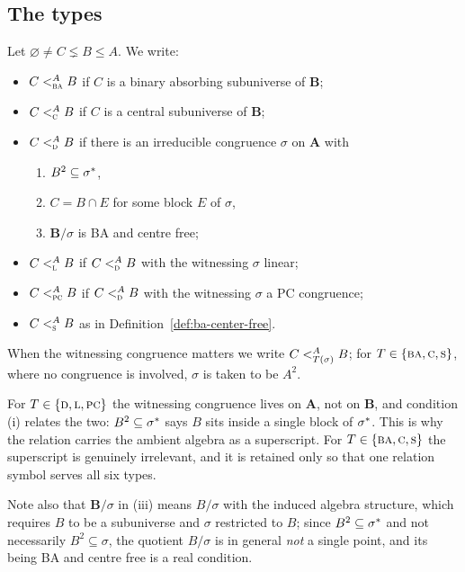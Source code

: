 \subsection{The types}

\begin{definition}\label{def:types}
Let $\varnothing\neq C\lneq B\le A$. We write:
\begin{itemize}\tightlist
\item $C\subt[A]{\TBA}B$ if $C$ is a binary absorbing subuniverse of
  $\mathbf B$;
\item $C\subt[A]{\TC}B$ if $C$ is a central subuniverse of $\mathbf B$;
\item $C\subt[A]{\TD}B$ if there is an irreducible congruence $\sigma$ on
  $\mathbf A$ with
  \begin{enumerate}\romanlabels\tightlist
  \item $B^{2}\subseteq\cover{\sigma}$,
  \item $C=B\cap E$ for some block $E$ of $\sigma$,
  \item $\mathbf B/\sigma$ is BA and centre free;
  \end{enumerate}
\item $C\subt[A]{\TL}B$ if $C\subt[A]{\TD}B$ with the witnessing $\sigma$
  linear;
\item $C\subt[A]{\TPC}B$ if $C\subt[A]{\TD}B$ with the witnessing $\sigma$ a PC
  congruence;
\item $C\subt[A]{\TS}B$ as in Definition~\ref{def:ba-center-free}.
\end{itemize}
When the witnessing congruence matters we write $C\subt[A]{T(\sigma)}B$; for
$T\in\{\TBA,\TC,\TS\}$, where no congruence is involved, $\sigma$ is taken to
be $A^{2}$.
\end{definition}

\begin{hazard}\label{haz:superscript}
For $T\in\{\TD,\TL,\TPC\}$ the witnessing congruence lives on $\mathbf A$, not
on $\mathbf B$, and condition (i) relates the two: $B^{2}\subseteq
\cover{\sigma}$ says $B$ sits inside a single block of $\cover{\sigma}$. This
is why the relation carries the ambient algebra as a superscript. For
$T\in\{\TBA,\TC,\TS\}$ the superscript is genuinely irrelevant, and it is
retained only so that one relation symbol serves all six types.

Note also that $\mathbf B/\sigma$ in (iii) means $B/\sigma$ with the induced
algebra structure, which requires $B$ to be a subuniverse and $\sigma$
restricted to $B$; since $B^{2}\subseteq\cover{\sigma}$ and not necessarily
$B^{2}\subseteq\sigma$, the quotient $B/\sigma$ is in general \emph{not} a
single point, and its being BA and centre free is a real condition.
\end{hazard}

